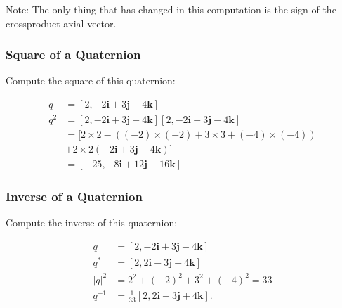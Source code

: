 \documentclass[10pt]{article}
\begin{document}
Note: The only thing that has changed in this computation is the sign of the crossproduct axial vector.

\subsubsection{Square of a Quaternion}
Compute the square of this quaternion:

$$
\begin{aligned}
q & =[2,-2 \mathbf{i}+3 \mathbf{j}-4 \mathbf{k}] \\
q^{2} & =[2,-2 \mathbf{i}+3 \mathbf{j}-4 \mathbf{k}][2,-2 \mathbf{i}+3 \mathbf{j}-4 \mathbf{k}] \\
& =[2 \times 2-((-2) \times(-2)+3 \times 3+(-4) \times(-4)) \\
& +2 \times 2(-2 \mathbf{i}+3 \mathbf{j}-4 \mathbf{k})] \\
& =[-25,-8 \mathbf{i}+12 \mathbf{j}-16 \mathbf{k}]
\end{aligned}
$$

\subsubsection{Inverse of a Quaternion}
Compute the inverse of this quaternion:

$$
\begin{aligned}
q & =[2,-2 \mathbf{i}+3 \mathbf{j}-4 \mathbf{k}] \\
q^{*} & =[2,2 \mathbf{i}-3 \mathbf{j}+4 \mathbf{k}] \\
|q|^{2} & =2^{2}+(-2)^{2}+3^{2}+(-4)^{2}=33 \\
q^{-1} & =\frac{1}{33}[2,2 \mathbf{i}-3 \mathbf{j}+4 \mathbf{k}] .
\end{aligned}
$$
\end{document}
